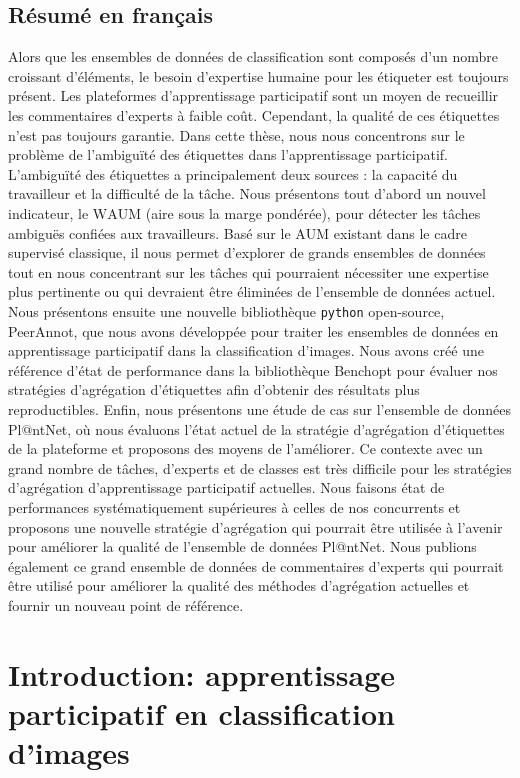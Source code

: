 \subsection{Résumé en français}
Alors que les ensembles de données de classification sont composés d'un nombre croissant d'éléments, le besoin d'expertise humaine pour les étiqueter est toujours présent. Les plateformes d'apprentissage participatif sont un moyen de recueillir les commentaires d'experts à faible coût. Cependant, la qualité de ces étiquettes n'est pas toujours garantie. Dans cette thèse, nous nous concentrons sur le problème de l'ambiguïté des étiquettes dans l'apprentissage participatif. L'ambiguïté des étiquettes a principalement deux sources : la capacité du travailleur et la difficulté de la tâche. Nous présentons tout d'abord un nouvel indicateur, le $\mathrm{WAUM}$ (aire sous la marge pondérée), pour détecter les tâches ambiguës confiées aux travailleurs. Basé sur le $\mathrm{AUM}$ existant dans le cadre supervisé classique, il nous permet d'explorer de grands ensembles de données tout en nous concentrant sur les tâches qui pourraient nécessiter une expertise plus pertinente ou qui devraient être éliminées de l'ensemble de données actuel. Nous présentons ensuite une nouvelle bibliothèque \texttt{python} open-source, PeerAnnot, que nous avons développée pour traiter les ensembles de données en apprentissage participatif dans la classification d'images. Nous avons créé une référence d'état de performance dans la bibliothèque Benchopt pour évaluer nos stratégies d'agrégation d'étiquettes afin d'obtenir des résultats plus reproductibles. Enfin, nous présentons une étude de cas sur l'ensemble de données Pl@ntNet, où nous évaluons l'état actuel de la stratégie d'agrégation d'étiquettes de la plateforme et proposons des moyens de l'améliorer. Ce contexte avec un grand nombre de tâches, d'experts et de classes est très difficile pour les stratégies d'agrégation d'apprentissage participatif actuelles. Nous faisons état de performances systématiquement supérieures à celles de nos concurrents et proposons une nouvelle stratégie d'agrégation qui pourrait être utilisée à l'avenir pour améliorer la qualité de l'ensemble de données Pl@ntNet. Nous publions également ce grand ensemble de données de commentaires d'experts qui pourrait être utilisé pour améliorer la qualité des méthodes d'agrégation actuelles et fournir un nouveau point de référence.

\section{Introduction: apprentissage participatif en classification d'images}

